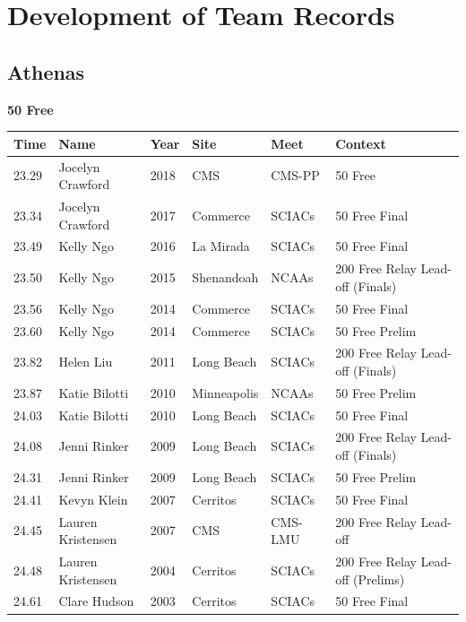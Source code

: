 \section{Development of Team Records}
\clearpage
\subsection{Athenas}
\vspace{1.2em}
\noindent\begin{minipage}[t]{0.98\textwidth}
\centering
\textbf{\textcolor{teamprimary}{50 Free}}\par
\vspace{0.5em}
\centering
\small
\renewcommand{\arraystretch}{1.0}
\setlength{\tabcolsep}{4pt}
\begin{tabular}{@{}p{2.0cm}p{3.2cm}p{1.2cm}p{2.0cm}p{2.0cm}p{2.5cm}@{}}
\toprule
\textbf{Time} & \textbf{Name} & \textbf{Year} & \textbf{Site} & \textbf{Meet} & \textbf{Context} \\
\midrule
23.29 & Jocelyn Crawford & 2018 & CMS & CMS-PP & 50 Free \\
23.34 & Jocelyn Crawford & 2017 & Commerce & SCIACs & 50 Free Final \\
23.49 & Kelly Ngo & 2016 & La Mirada & SCIACs & 50 Free Final \\
23.50 & Kelly Ngo & 2015 & Shenandoah & NCAAs & 200 Free Relay Lead-off (Finals) \\
23.56 & Kelly Ngo & 2014 & Commerce & SCIACs & 50 Free Final \\
23.60 & Kelly Ngo & 2014 & Commerce & SCIACs & 50 Free Prelim \\
23.82 & Helen Liu & 2011 & Long Beach & SCIACs & 200 Free Relay Lead-off (Finals) \\
23.87 & Katie Bilotti & 2010 & Minneapolis & NCAAs & 50 Free Prelim \\
24.03 & Katie Bilotti & 2010 & Long Beach & SCIACs & 50 Free Final \\
24.08 & Jenni Rinker & 2009 & Long Beach & SCIACs & 200 Free Relay Lead-off (Finals) \\
24.31 & Jenni Rinker & 2009 & Long Beach & SCIACs & 50 Free Prelim \\
24.41 & Kevyn Klein & 2007 & Cerritos & SCIACs & 50 Free Final \\
24.45 & Lauren Kristensen & 2007 & CMS & CMS-LMU & 200 Free Relay Lead-off \\
24.48 & Lauren Kristensen & 2004 & Cerritos & SCIACs & 200 Free Relay Lead-off (Prelims) \\
24.61 & Clare Hudson & 2003 & Cerritos & SCIACs & 50 Free Final \\
\bottomrule
\end{tabular}
\end{minipage}
